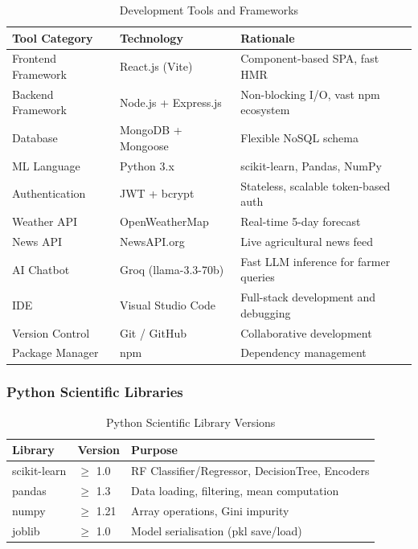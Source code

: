\begin{table}[ht]
\centering
\caption{Development Tools and Frameworks}
\label{tab:dev_tools}
\begin{tabular}{|p{3cm}|p{3.5cm}|p{6cm}|}
\hline
\textbf{Tool Category} & \textbf{Technology} & \textbf{Rationale} \\
\hline
Frontend Framework & React.js (Vite) & Component-based SPA, fast HMR \\
Backend Framework & Node.js + Express.js & Non-blocking I/O, vast npm ecosystem \\
Database & MongoDB + Mongoose & Flexible NoSQL schema \\
ML Language & Python 3.x & scikit-learn, Pandas, NumPy \\
Authentication & JWT + bcrypt & Stateless, scalable token-based auth \\
Weather API & OpenWeatherMap & Real-time 5-day forecast \\
News API & NewsAPI.org & Live agricultural news feed \\
AI Chatbot & Groq (llama-3.3-70b) & Fast LLM inference for farmer queries \\
IDE & Visual Studio Code & Full-stack development and debugging \\
Version Control & Git / GitHub & Collaborative development \\
Package Manager & npm & Dependency management \\
\hline
\end{tabular}
\end{table}

\subsubsection*{Python Scientific Libraries}

\begin{table}[ht]
\centering
\caption{Python Scientific Library Versions}
\label{tab:py_libs}
\begin{tabular}{|l|l|p{7cm}|}
\hline
\textbf{Library} & \textbf{Version} & \textbf{Purpose} \\
\hline
scikit-learn & $\geq$ 1.0 & RF Classifier/Regressor, DecisionTree, Encoders \\
pandas & $\geq$ 1.3 & Data loading, filtering, mean computation \\
numpy & $\geq$ 1.21 & Array operations, Gini impurity \\
joblib & $\geq$ 1.0 & Model serialisation (pkl save/load) \\
\hline
\end{tabular}
\end{table}

